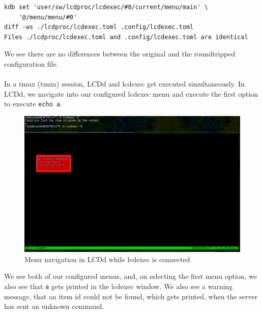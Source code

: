 \documentclass[draft,final]{vutinfth} %
\begin{document}
\begin{Verbatim}[frame=single, fontsize=\small]
kdb set 'user/sw/lcdproc/lcdexec/#0/current/menu/main' \
	'@/menu/menu/#0'
diff -ws ./lcdproc/lcdexec.toml .config/lcdexec.toml 
Files ./lcdproc/lcdexec.toml and .config/lcdexec.toml are identical
\end{Verbatim}
We see there are no differences between the original and the roundtripped configuration file.
\\\\
In a \acrshort{tmux} (\acrlong{tmux}) session, LCDd and lcdexec get executed simultaneously.
In LCDd, we navigate into our configured lcdexec menu and execute the first option to execute \texttt{echo a}.
\FloatBarrier
\begin{figure}[!ht]
	\centering
		\includegraphics[width=\linewidth]{graphics/lcdexec_menu.png}
  \caption{Menu navigation in LCDd while lcdexec is connected}
\label{fig:lcdexec}
\end{figure}
\FloatBarrier
We see both of our configured menus, and, on selecting the first menu option, we also see that \texttt{a} gets printed in the lcdexec window.
We also see a warning message, that an item id could not be found, which gets printed, when the server has sent an unknown command.
\end{document}
